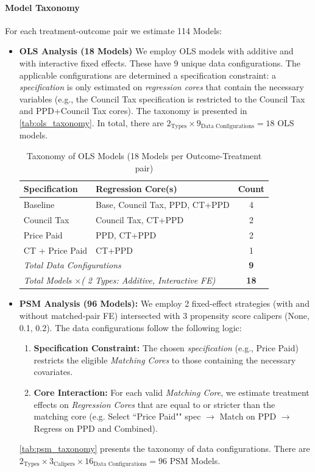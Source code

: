 \documentclass[12pt]{article}
\begin{document}
\paragraph{Model Taxonomy}
For each treatment-outcome pair we estimate 114 Models:
\begin{itemize}
    \item \textbf{OLS Analysis (18 Models)} We employ OLS models with additive and with interactive fixed effects. These have 9 unique data configurations. The applicable configurations are determined a specification constraint: a \textit{specification} is only estimated on \textit{regression cores} that contain the necessary variables (e.g., the Council Tax specification is restricted to the Council Tax and PPD+Council Tax cores). The taxonomy is presented in \autoref{tab:ols_taxonomy}. In total, there are $2_\text{Types} \times9_\text{Data Configurations}=18$ OLS models. 
    
\begin{table}[ht]
\centering
\caption{Taxonomy of OLS Models (18 Models  per Outcome-Treatment pair)}
\label{tab:ols_taxonomy}
\begin{tabular}{llc}
\toprule
\textbf{Specification} & \textbf{Regression Core(s)} & \textbf{Count} \\
\midrule
Baseline & Base, Council Tax, PPD, CT+PPD & 4 \\
Council Tax & Council Tax, CT+PPD & 2 \\
Price Paid & PPD, CT+PPD & 2 \\
CT + Price Paid & CT+PPD & 1 \\
\midrule
\multicolumn{2}{l}{\textit{Total Data Configurations}} & \textbf{9} \\
\multicolumn{2}{l}{\textit{Total Models $\times$( 2 Types: Additive, Interactive FE)}} & \textbf{18} \\
\bottomrule
\end{tabular}
\end{table}

    \item \textbf{PSM Analysis (96 Models):} We employ 2 fixed-effect strategies (with and without matched-pair FE) intersected with 3 propensity score calipers (None, 0.1, 0.2). The data configurations follow the following logic:
    \begin{enumerate}
    \item \textbf{Specification Constraint:} The chosen \textit{specification} (e.g., Price Paid) restricts the eligible \textit{Matching Cores} to those containing the necessary covariates.
    \item \textbf{Core Interaction:} For each valid \textit{Matching Core}, we estimate treatment effects on \textit{Regression Cores} that are equal to or stricter than the matching core (e.g. Select ``Price Paid"" spec $\to$ Match on PPD $\to$ Regress on PPD and Combined).
\end{enumerate}
\autoref{tab:psm_taxonomy} presents the taxonomy of data configurations. There are $2_\text{Types} \times 3_\text{Calipers} \times 16_\text{Data Configurations}= 96 $ PSM Models. 
\end{itemize}
\end{document}
